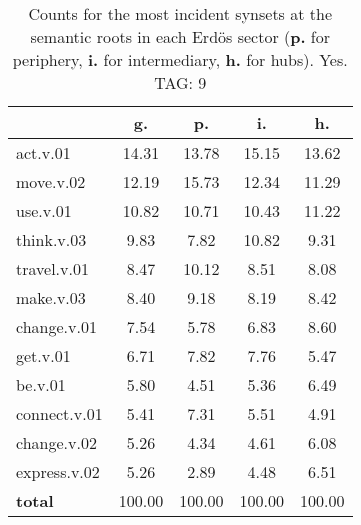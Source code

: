 \begin{table}[h!]
\begin{center}
\begin{tabular}{| l || c | c | c | c |}\hline
 & {\bf g.} & {\bf p.} & {\bf i.} & {\bf h.} \\\hline\hline
act.v.01 & 14.31  & 13.78  & 15.15  & 13.62 \\\hline
move.v.02 & 12.19  & 15.73  & 12.34  & 11.29 \\\hline
use.v.01 & 10.82  & 10.71  & 10.43  & 11.22 \\\hline
think.v.03 & 9.83  & 7.82  & 10.82  & 9.31 \\\hline
travel.v.01 & 8.47  & 10.12  & 8.51  & 8.08 \\\hline
make.v.03 & 8.40  & 9.18  & 8.19  & 8.42 \\\hline
change.v.01 & 7.54  & 5.78  & 6.83  & 8.60 \\\hline
get.v.01 & 6.71  & 7.82  & 7.76  & 5.47 \\\hline
be.v.01 & 5.80  & 4.51  & 5.36  & 6.49 \\\hline
connect.v.01 & 5.41  & 7.31  & 5.51  & 4.91 \\\hline
change.v.02 & 5.26  & 4.34  & 4.61  & 6.08 \\\hline
express.v.02 & 5.26  & 2.89  & 4.48  & 6.51 \\\hline\hline
{{\bf total}} & 100.00  & 100.00  & 100.00  & 100.00 \\\hline
\end{tabular}
\caption{Counts for the most incident synsets at the semantic roots in each Erd\"os sector ({\bf p.} for periphery, {\bf i.} for intermediary, {\bf h.} for hubs). Yes. TAG: 9}
\end{center}
\end{table}